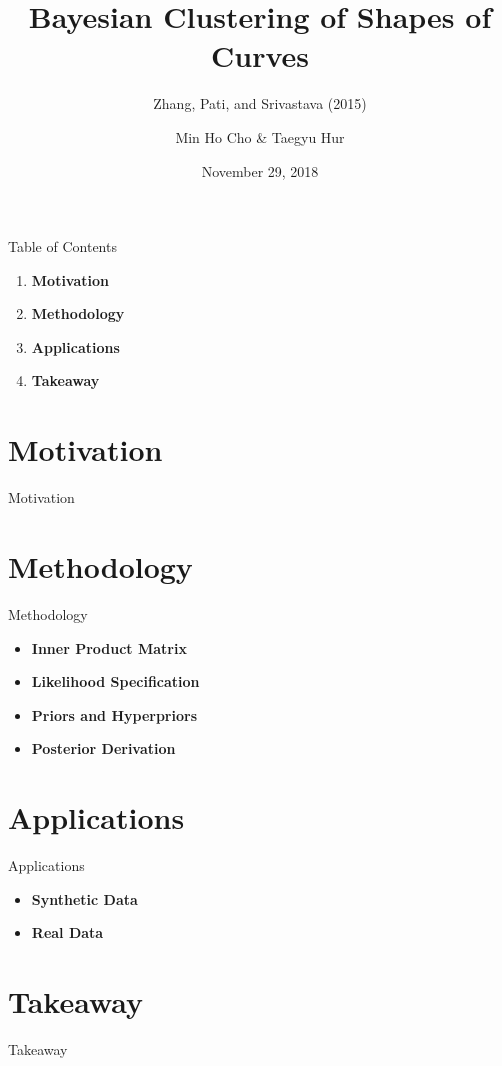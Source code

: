 \documentclass{beamer}
\title{Bayesian Clustering of Shapes of Curves}
\subtitle{Zhang, Pati, and Srivastava (2015)}
\date{November 29, 2018}
\author{Min Ho Cho \& Taegyu Hur}
\institute{STAT 8820 Final Project}
\begin{document}
  \maketitle
  
 \begin{frame}{Table of Contents}
  \begin{enumerate}
   \item \textbf{Motivation}
   \item \textbf{Methodology}    
   \item \textbf{Applications}  
   \item \textbf{Takeaway}
  \end{enumerate}
 \end{frame}
  
 \section{Motivation}  
  
 \begin{frame}{Motivation}


 \end{frame}
 

  \section{Methodology}  
   
 \begin{frame}{Methodology}
 \begin{itemize}
    \item \textbf{Inner Product Matrix} 
    \item \textbf{Likelihood Specification}  
    \item \textbf{Priors and Hyperpriors}  
    \item \textbf{Posterior Derivation}  
   
  \end{itemize}
 \end{frame}
 

  
  \section{Applications}  
  
 \begin{frame}{Applications}
   \begin{itemize}
    \item \textbf{Synthetic Data} 
    \item \textbf{Real Data} 
  \end{itemize}
 \end{frame}
 
 
 
 \section{Takeaway}  
  
 \begin{frame}{Takeaway}

 \end{frame}

  
\end{document}

